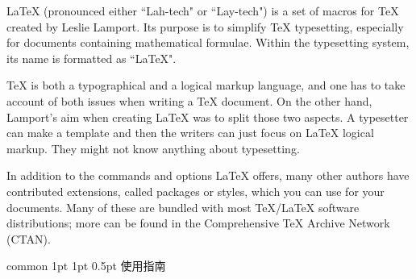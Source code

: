 \documentclass[report,oneside,UTF8,zihao=-4]{config}
\begin{document}
\begin{abstractEN}[0.7cm] %

\LaTeX{} (pronounced either ``Lah-tech" or ``Lay-tech") is a set of macros for \TeX{} created by Leslie Lamport. Its purpose is to simplify \TeX{} typesetting, especially for documents containing mathematical formulae. Within the typesetting system, its name is formatted as ``\LaTeX{}".

\TeX{} is both a typographical and a logical markup language, and one has to take account of both issues when writing a \TeX{} document. On the other hand, Lamport's aim when creating \LaTeX{} was to split those two aspects. A typesetter can make a template and then the writers can just focus on \LaTeX{} logical markup. They might not know anything about typesetting.

In addition to the commands and options \LaTeX{} offers, many other authors have contributed extensions, called packages or styles, which you can use for your documents. Many of these are bundled with most \TeX{}/\LaTeX{} software distributions; more can be found in the Comprehensive \TeX{} Archive Network (CTAN).

\def\keywordsEN{keyword 1，keyword 2，keyword 3，keyword 4，keyword 5}

\end{abstractEN}


       



\Header
    {common} %
    {1pt} %
    {1pt} %
    {0.5pt} %
    {使用指南} %
    {} %
    {\currentChapterInfo} %

\end{document}
